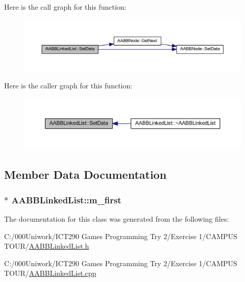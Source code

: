 Here is the call graph for this function\+:
\nopagebreak
\begin{figure}[H]
\begin{center}
\leavevmode
\includegraphics[width=350pt]{class_a_a_b_b_linked_list_a9466a3aaffb597d9976259726b44463a_cgraph}
\end{center}
\end{figure}




Here is the caller graph for this function\+:
\nopagebreak
\begin{figure}[H]
\begin{center}
\leavevmode
\includegraphics[width=350pt]{class_a_a_b_b_linked_list_a9466a3aaffb597d9976259726b44463a_icgraph}
\end{center}
\end{figure}




\subsection{Member Data Documentation}
\subsubsection[{\texorpdfstring{m\+\_\+first}{m_first}}]{$\ast$ A\+A\+B\+B\+Linked\+List\+::m\+\_\+first\hspace{0.3cm}{\ttfamily [private]}}\hypertarget{class_a_a_b_b_linked_list_ae5641ef70823a45200dc68b28bf47351}{}\label{class_a_a_b_b_linked_list_ae5641ef70823a45200dc68b28bf47351}


The documentation for this class was generated from the following files\+:\begin{DoxyCompactItemize}
\item 
C\+:/000\+Uniwork/\+I\+C\+T290 Games Programming Try 2/\+Exercise 1/\+C\+A\+M\+P\+U\+S T\+O\+U\+R/\hyperlink{_a_a_b_b_linked_list_8h}{A\+A\+B\+B\+Linked\+List.\+h}\item 
C\+:/000\+Uniwork/\+I\+C\+T290 Games Programming Try 2/\+Exercise 1/\+C\+A\+M\+P\+U\+S T\+O\+U\+R/\hyperlink{_a_a_b_b_linked_list_8cpp}{A\+A\+B\+B\+Linked\+List.\+cpp}\end{DoxyCompactItemize}
